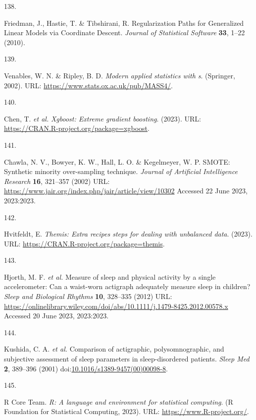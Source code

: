 \documentclass[
  9pt,
]{scrbook}
\newlength{\cslhangindent}
\newlength{\csllabelwidth}
\newlength{\cslentryspacingunit} %
\newenvironment{CSLReferences}[2] %
 {%
  \setlength{\parindent}{0pt}
  \ifodd #1
  \let\oldpar\par
  \def\par{\hangindent=\cslhangindent\oldpar}
  \fi
  \setlength{\parskip}{#2\cslentryspacingunit}
 }%
 {}
\newcommand{\CSLLeftMargin}[1]{\parbox[t]{\csllabelwidth}{#1}}
\newcommand{\CSLRightInline}[1]{\parbox[t]{\linewidth - \csllabelwidth}{#1}\break}
\begin{document}
\begin{CSLReferences}{0}{0}
\leavevmode{}%
\CSLLeftMargin{138. }%
\CSLRightInline{Friedman, J., Hastie, T. \& Tibshirani, R.
Regularization Paths for Generalized Linear Models via Coordinate
Descent. \emph{Journal of Statistical Software} \textbf{33}, 1--22
(2010).}

\leavevmode{}%
\CSLLeftMargin{139. }%
\CSLRightInline{Venables, W. N. \& Ripley, B. D. \emph{Modern applied
statistics with s}. (Springer, 2002). URL:
\url{https://www.stats.ox.ac.uk/pub/MASS4/}.}

\leavevmode{}%
\CSLLeftMargin{140. }%
\CSLRightInline{Chen, T. \emph{et al.} \emph{Xgboost: Extreme gradient
boosting}. (2023). URL:
\url{https://CRAN.R-project.org/package=xgboost}.}

\leavevmode{}%
\CSLLeftMargin{141. }%
\CSLRightInline{Chawla, N. V., Bowyer, K. W., Hall, L. O. \& Kegelmeyer,
W. P. {SMOTE}: Synthetic minority over-sampling technique. \emph{Journal
of Artificial Intelligence Research} \textbf{16}, 321--357 (2002) URL:
\url{https://www.jair.org/index.php/jair/article/view/10302} Accessed 22
June 2023, 2023:2023.}

\leavevmode{}%
\CSLLeftMargin{142. }%
\CSLRightInline{Hvitfeldt, E. \emph{Themis: Extra recipes steps for
dealing with unbalanced data}. (2023). URL:
\url{https://CRAN.R-project.org/package=themis}.}

\leavevmode{}%
\CSLLeftMargin{143. }%
\CSLRightInline{Hjorth, M. F. \emph{et al.} Measure of sleep and
physical activity by a single accelerometer: Can a waist-worn actigraph
adequately measure sleep in children? \emph{Sleep and Biological
Rhythms} \textbf{10}, 328--335 (2012) URL:
\url{https://onlinelibrary.wiley.com/doi/abs/10.1111/j.1479-8425.2012.00578.x}
Accessed 20 June 2023, 2023:2023.}

\leavevmode{}%
\CSLLeftMargin{144. }%
\CSLRightInline{Kushida, C. A. \emph{et al.} Comparison of actigraphic,
polysomnographic, and subjective assessment of sleep parameters in
sleep-disordered patients. \emph{Sleep Med} \textbf{2}, 389--396 (2001)
doi:\href{https://doi.org/10.1016/s1389-9457(00)00098-8}{10.1016/s1389-9457(00)00098-8}.}

\leavevmode{}%
\CSLLeftMargin{145. }%
\CSLRightInline{R Core Team. \emph{R: A language and environment for
statistical computing}. (R Foundation for Statistical Computing, 2023).
URL: \url{https://www.R-project.org/}.}


\end{CSLReferences}
\end{document}
